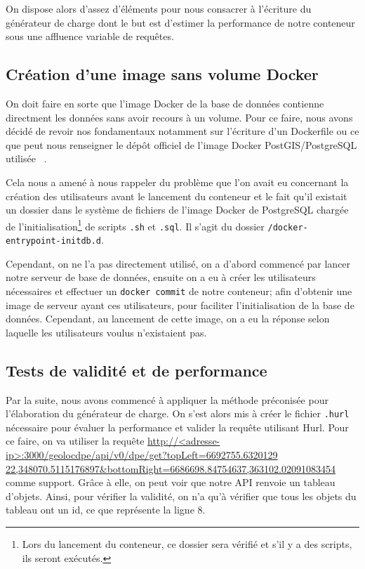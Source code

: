 On dispose alors d'assez d'\'el\'ements pour nous consacrer \`a l'\'ecriture du g\'en\'erateur de charge dont le but est d'estimer la performance de notre conteneur sous une affluence variable de requ\^etes.

\subsection{Cr\'eation d'une image sans volume Docker}
On doit faire en sorte que l'image Docker de la base de donn\'ees contienne directment les donn\'ees sans avoir recours \`a un volume. Pour ce faire, 
nous avons d\'ecid\'e de revoir nos fondamentaux notamment sur l'\'ecriture d'un Dockerfile ou ce que peut nous renseigner le d\'ep\^ot officiel de l'image Docker PostGIS/PostgreSQL utilis\'ee ~\cite{docker-postgres}.

Cela nous a amen\'e \`a nous rappeler du probl\`eme que l'on avait eu concernant la cr\'eation des utilisateurs avant le lancement du conteneur et le fait qu'il existait un dossier dans le syst\`eme de fichiers de
l'image Docker de PostgreSQL charg\'ee de l'initialisation\footnote{Lors du lancement du conteneur, ce dossier sera v\'erifi\'e et s'il y a des scripts, ils seront ex\'ecut\'es.} de scripts \lstinline{.sh} et 
\lstinline{.sql}. Il s'agit du dossier \lstinline{/docker-entrypoint-initdb.d}.

Cependant, on ne l'a pas directement utilis\'e, on a d'abord commenc\'e par lancer notre serveur de base de donn\'ees, ensuite on a eu \`a cr\'eer les utilisateurs n\'ecessaires et effectuer un 
\lstinline{docker commit}  de notre conteneur; afin d'obtenir une image de serveur ayant ces utilisateurs, pour faciliter l'initialisation de la base de donn\'ees. Cependant, 
au lancement de cette image, on a eu la r\'eponse selon laquelle les utilisateurs voulus n'existaient pas.

\subsection{Tests de validit\'e et de performance}

Par la suite, nous avons commenc\'e \`a appliquer la m\'ethode pr\'econis\'ee pour l'\'elaboration du g\'en\'erateur de charge. On s'est alors mis \`a cr\'eer le fichier \lstinline{.hurl} n\'ecessaire 
pour \'evaluer la performance et valider la requ\^ete utilisant Hurl. Pour ce faire, on va utiliser la requ\^ete \url{http://<adresse-ip>:3000/geolocdpe/api/v0/dpe/get?topLeft=6692755.6320129
22,348070.5115176897&bottomRight=6686698.84754637,363102.02091083454} comme support. Gr\^ace \`a elle, on peut voir que notre API renvoie un tableau d'objets. Ainsi, pour v\'erifier la validit\'e, 
on n'a qu'\`a v\'erifier que tous les objets du tableau ont un id, ce que repr\'esente la ligne 8.

